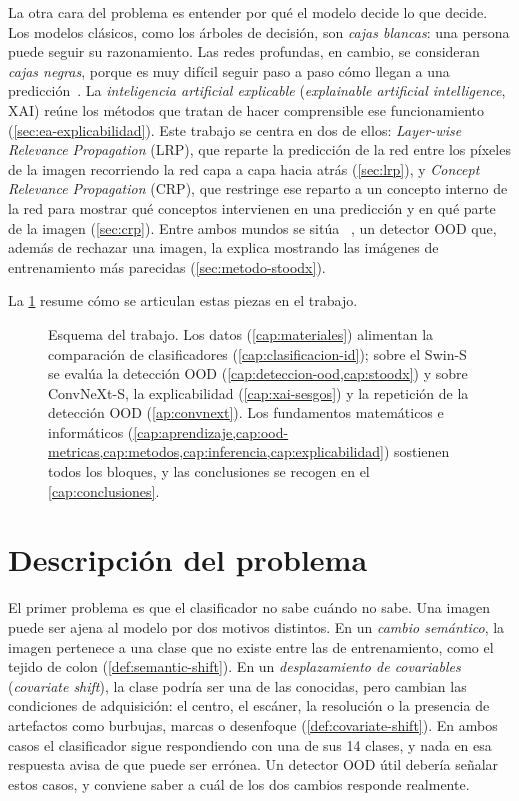 La otra cara del problema es entender por qué el modelo decide lo que decide. Los modelos clásicos, como los árboles de decisión, son \emph{cajas blancas}: una persona puede seguir su razonamiento. Las redes profundas, en cambio, se consideran \emph{cajas negras}, porque es muy difícil seguir paso a paso cómo llegan a una predicción~\cite{sevillano2025tesis}. La \emph{inteligencia artificial explicable} (\emph{explainable artificial intelligence}, XAI) reúne los métodos que tratan de hacer comprensible ese funcionamiento (\cref{sec:ea-explicabilidad}). Este trabajo se centra en dos de ellos: \emph{Layer-wise Relevance Propagation} (LRP), que reparte la predicción de la red entre los píxeles de la imagen recorriendo la red capa a capa hacia atrás (\cref{sec:lrp}), y \emph{Concept Relevance Propagation} (CRP), que restringe ese reparto a un concepto interno de la red para mostrar qué conceptos intervienen en una predicción y en qué parte de la imagen (\cref{sec:crp}). Entre ambos mundos se sitúa \stoodx~\cite{sevillano2026}, un detector OOD que, además de rechazar una imagen, la explica mostrando las imágenes de entrenamiento más parecidas (\cref{sec:metodo-stoodx}).

La \cref{fig:esquema-trabajo} resume cómo se articulan estas piezas en el trabajo.

\begin{figure}[tbp]
  \centering
  
  \caption{Esquema del trabajo. Los datos (\cref{cap:materiales}) alimentan la comparación de clasificadores (\cref{cap:clasificacion-id}); sobre el Swin-S se evalúa la detección OOD (\cref{cap:deteccion-ood,cap:stoodx}) y sobre ConvNeXt-S, la explicabilidad (\cref{cap:xai-sesgos}) y la repetición de la detección OOD (\cref{ap:convnext}). Los fundamentos matemáticos e informáticos (\cref{cap:aprendizaje,cap:ood-metricas,cap:metodos,cap:inferencia,cap:explicabilidad}) sostienen todos los bloques, y las conclusiones se recogen en el \cref{cap:conclusiones}.}
  \label{fig:esquema-trabajo}
\end{figure}

\section{Descripción del problema}\label{sec:descripcion-problema}

El primer problema es que el clasificador no sabe cuándo no sabe. Una imagen puede ser ajena al modelo por dos motivos distintos. En un \emph{cambio semántico}, la imagen pertenece a una clase que no existe entre las de entrenamiento, como el tejido de colon (\cref{def:semantic-shift}). En un \emph{desplazamiento de covariables} (\emph{covariate shift}), la clase podría ser una de las conocidas, pero cambian las condiciones de adquisición: el centro, el escáner, la resolución o la presencia de artefactos como burbujas, marcas o desenfoque (\cref{def:covariate-shift}). En ambos casos el clasificador sigue respondiendo con una de sus 14 clases, y nada en esa respuesta avisa de que puede ser errónea. Un detector OOD útil debería señalar estos casos, y conviene saber a cuál de los dos cambios responde realmente.


